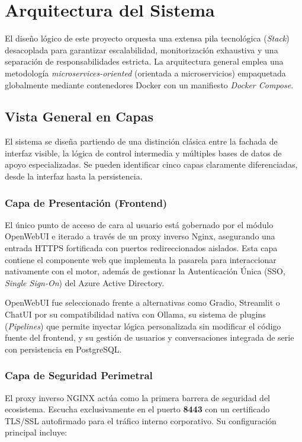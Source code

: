 \chapter{Arquitectura del Sistema}
\label{cap:arquitectura}

El diseño lógico de este proyecto orquesta una extensa pila tecnológica (\textit{Stack}) desacoplada para garantizar escalabilidad, monitorización exhaustiva y una separación de responsabilidades estricta. La arquitectura general emplea una metodología \textit{microservices-oriented} (orientada a microservicios) empaquetada globalmente mediante contenedores Docker con un manifiesto \textit{Docker Compose}.

\section{Vista General en Capas}
El sistema se diseña partiendo de una distinción clásica entre la fachada de interfaz visible, la lógica de control intermedia y múltiples bases de datos de apoyo especializadas. Se pueden identificar cinco capas claramente diferenciadas, desde la interfaz hasta la persistencia.

\subsection{Capa de Presentación (Frontend)}
El único punto de acceso de cara al usuario está gobernado por el módulo OpenWebUI e iterado a través de un proxy inverso Nginx, asegurando una entrada HTTPS fortificada con puertos redireccionados aislados. Esta capa contiene el componente web que implementa la pasarela para interaccionar nativamente con el motor, además de gestionar la Autenticación Única (SSO, \textit{Single Sign-On}) del Azure Active Directory.

OpenWebUI fue seleccionado frente a alternativas como Gradio, Streamlit o ChatUI por su compatibilidad nativa con Ollama, su sistema de plugins (\textit{Pipelines}) que permite inyectar lógica personalizada sin modificar el código fuente del frontend, y su gestión de usuarios y conversaciones integrada de serie con persistencia en PostgreSQL.

\subsection{Capa de Seguridad Perimetral}
El proxy inverso NGINX actúa como la primera barrera de seguridad del ecosistema. Escucha exclusivamente en el puerto \textbf{8443} con un certificado TLS/SSL autofirmado para el tráfico interno corporativo. Su configuración principal incluye:

